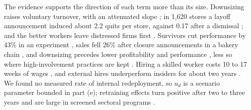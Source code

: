 The evidence supports the direction of each term more than its size. Downsizing raises voluntary turnover, with an attenuated slope \citep{trevor2008keeping,kim2025preventing}; in 1,620 stores a layoff announcement induced about 2.2 quits per store, against 0.17 after a dismissal \citep{sajjadiani2023who}; and the better workers leave distressed firms first \citep{schwerdt2011labor,lengermann2002abandoning}. Survivors cut performance by 43\% in an experiment \citep{drzensky2016hidden}, sales fell 26\% after closure announcements in a bakery chain \citep{friebel2021downsizing}, and downsizing precedes lower profitability and performance \citep{guthrie2008dumb,park2013turnover}, less so where high-involvement practices are kept \citep{zatzick2006high}. Hiring a skilled worker costs 10 to 17 weeks of wages \citep{blatter2012costs}, and external hires underperform insiders for about two years \citep{bidwell2011paying}. We found no measured rate of internal redeployment, so $u_d$ is a scenario parameter bounded in part (e); retraining effects turn positive after two to three years \citep{card2018what} and are large in screened sectoral programs \citep{katz2022why}.


